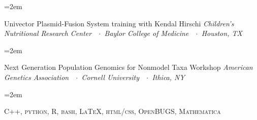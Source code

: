 \documentclass[9pt]{scrartcl}
\newcommand{\Description}[1]{\hangindent=2em\hangafter=0\noindent\raggedright\footnotesize{#1}\par\normalsize\vspace{0.5em}} %
\begin{document}
\begin{cv}{}
\vspace{0.5em} %


\vspace{0.5em}

\Description{Univector Plasmid-Fusion System training with Kendal Hirschi\newline
 \textit{Children’s Nutritional Research Center\ \ $\cdotp$\ Baylor College of Medicine\ \ $\cdotp$\ Houston, TX}}

\Description{Next Generation Population Genomics for Nonmodel Taxa Workshop\newline
 \textit{American Genetics Association\ \ $\cdotp$\ Cornell University\ \ $\cdotp$\ Ithica, NY}}


\vspace{0.5em} %



\vspace{0.5em}

\Description{\textsc{C++, python, R, bash, \LaTeX, html/css, OpenBUGS, Mathematica}}





\vspace{0.5em} %



\end{cv}
\end{document}
